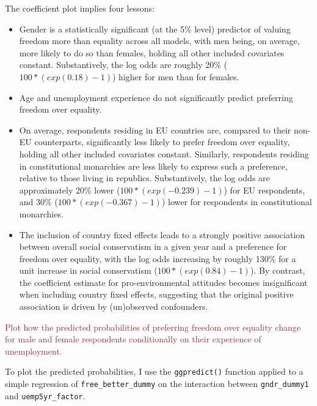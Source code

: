 \documentclass[
]{article}
\begin{document}
The coefficient plot implies four lessons:

\begin{itemize}
\item
  Gender is a statistically significant (at the 5\% level) predictor of
  valuing freedom more than equality across all models, with men being,
  on average, more likely to do so than females, holding all other
  included covariates constant. Substantively, the log odds are roughly
  20\% (\(100*(exp(0.18)-1)\)) higher for men than for females.
\item
  Age and unemployment experience do not significantly predict
  preferring freedom over equality.
\item
  On average, respondents residing in EU countries are, compared to
  their non-EU counterparts, significantly less likely to prefer freedom
  over equality, holding all other included covariates constant.
  Similarly, respondents residing in constitutional monarchies are less
  likely to express such a preference, relative to those living in
  republics. Substantively, the log odds are approximately 20\% lower
  (\(100*(exp(-0.239)-1)\)) for EU respondents, and 30\%
  (\(100*(exp(-0.367)-1)\)) lower for respondents in constitutional
  monarchies.
\item
  The inclusion of country fixed effects leads to a strongly positive
  association between overall social conservatism in a given year and a
  preference for freedom over equality, with the log odds increasing by
  roughly 130\% for a unit increase in social conservatism
  (\(100*(exp(0.84)-1)\)). By contrast, the coefficient estimate for
  pro-environmental attitudes becomes insignificant when including
  country fixed effects, suggesting that the original positive
  association is driven by (un)observed confounders.
\end{itemize}

\textcolor{brown}{Plot how the predicted probabilities of preferring freedom over equality change for male and female respondents conditionally on their experience of unemployment.}

To plot the predicted probabilities, I use the \texttt{ggpredict()}
function applied to a simple regression of \texttt{free\_better\_dummy}
on the interaction between \texttt{gndr\_dummy1} and
\texttt{uemp5yr\_factor}.
\end{document}
